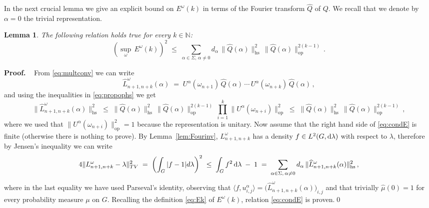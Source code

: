 \documentclass[a4paper,reqno,11pt]{amsart}
\numberwithin{equation}{section}
\newtheorem{lemma}[theorem]{Lemma}
\newcommand{\ga}{\alpha}
\newcommand{\gl}{\lambda}
\newcommand{\go}{\omega}
\newcommand{\dd}{\text{\rm d}}             %
\newcommand{\N}{\mathbb{N}}
\def\proof{\noindent\textbf{Proof.} \ }
\newcommand{\somb}{\widehat} %
\begin{document}
In the next crucial lemma we give an explicit bound on $E^\go(k)$
in terms of the Fourier transform $\somb Q$ of $Q$.
We recall that we denote by $\ga = 0$ the trivial representation.

\smallskip
\begin{lemma} \label{lem:crucial}
The following relation holds true for every $k \in \N$:
\begin{equation} \label{eq:condE}
	\left( \sup_\go \, E^\go(k) \right)^2 
	\;\le\; \sum_{\alpha \in \Sigma, \, \alpha \ne 0}
	d_{\alpha} \,  \|\somb Q(\alpha)\|_{\mathrm{hs}}^{2} \,
	\|\somb Q(\alpha)\|_{\mathrm{op}}^{2(k-1)} \,.
\end{equation}
\end{lemma}
\smallskip

\proof
From \eqref{eq:multconv} we can write
\begin{equation} \label{eq:mydec}
\somb L^\go_{n+1,n+k}(\alpha) \;=\;
U^\alpha(\go_{n+1}) \, \somb Q(\alpha) \,\cdots \,
U^\alpha(\go_{n+k}) \, \somb Q(\alpha)\,,
\end{equation}
and using the inequalities in \eqref{eq:propophs} we get
\begin{equation}
\|\somb L^\go_{n+1,n+k}(\alpha)\|^2_{\mathrm{hs}} \;\le\;
\|\somb Q(\alpha) \|^{2}_{\mathrm{hs}} \,
\|\somb Q(\alpha) \|^{2(k-1)}_{\mathrm{op}} \,
\prod_{i=1}^k \| U^\alpha(\omega_{n+i} ) \|^2_{\mathrm{op}}
\;\le\; \|\somb Q(\alpha) \|^{2}_{\mathrm{hs}} \,
\|\somb Q(\alpha) \|^{2(k-1)}_{\mathrm{op}} \,,
\end{equation}
where we used that $\| U^\alpha(\go_{n+i} )\|^2_{\mathrm{op}} = 1$
because the representation is unitary.
Now assume that the right hand side of \eqref{eq:condE} is finite
(otherwise there is nothing to prove). By Lemma~\ref{lem:Fourinv}, 
$L^\go_{n+1,n+k}$ has a density 
$f \in L^2(G, \dd\gl)$ with respect to $\lambda$, therefore
by Jensen's inequality we can write
\begin{equation}
	4 \| L^\go_{n+1,n+k} - \lambda \|^2_{TV} \;=\; 
	\left(\int_G |f-1| d\lambda\right)^2 \;\le\;
	\int_G f^2 \, \dd \gl \; - \; 1  \;=\;
	\sum_{\alpha \in \Sigma, \, \ga \ne 0} d_{\alpha} \,
	\|\somb L^\go_{n+1,n+k} (\alpha) \|^2_{\mathrm{hs}} \,,  
\end{equation}
where in the last equality we have used Parseval's identity,
observing that $\langle f, u^\ga_{i,j} \rangle =
\big(\somb L^\go_{n+1,n+k} (\alpha)\big)_{i,j}$ and
that trivially $\somb \mu(0) = 1$ for every probability measure $\mu$
on $G$. Recalling the definition \eqref{eq:Ek} of $E^\go(k)$,
relation \eqref{eq:condE} is proven.\qed
\medskip
\end{document}
